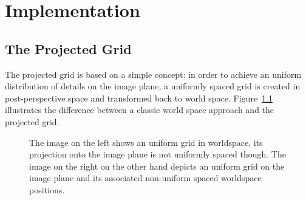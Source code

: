 \chapter{Implementation}
\label{ch:implementation}

\section{The Projected Grid}
\label{sec_projected_grid}
The projected grid is based on a simple concept: in order to achieve an
uniform distribution of details on the image plane, a uniformly spaced grid is
created in post-perspective space and transformed back to world space.
Figure~\ref{fig:projectedgrid} illustrates the difference between a classic
world space approach and the projected grid.
\begin{figure}[h]
\centering
{}
\caption{The image on the left shows an uniform grid in worldspace,
its projection onto the image plane is not uniformly spaced though.
The image on the right on the other hand depicts an uniform grid on
the image plane and its associated non-uniform spaced worldspace
positions.}
\label{fig:projectedgrid}
\end{figure}

